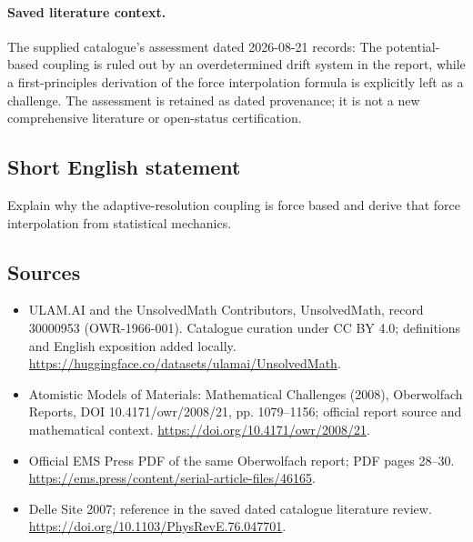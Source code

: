 \documentclass[11pt]{article}
\begin{document}
\paragraph{Saved literature context.} The supplied catalogue's assessment dated 2026-08-21 records: The potential-based coupling is ruled out by an overdetermined drift system in the report, while a first-principles derivation of the force interpolation formula is explicitly left as a challenge. The assessment is retained as dated provenance; it is not a new comprehensive literature or open-status certification.
\subsection{Short English statement}
Explain why the adaptive-resolution coupling is force based and derive that force interpolation from statistical mechanics.
\subsection{Sources}
\begin{itemize}
\item[\hypertarget{source:30000953:1}{S1}] ULAM.AI and the UnsolvedMath Contributors, UnsolvedMath, record 30000953 (OWR-1966-001). Catalogue curation under CC BY 4.0; definitions and English exposition added locally.
\url{https://huggingface.co/datasets/ulamai/UnsolvedMath}.
\item[\hypertarget{source:30000953:2}{S2}] Atomistic Models of Materials: Mathematical Challenges (2008), Oberwolfach Reports, DOI 10.4171/owr/2008/21, pp. 1079--1156; official report source and mathematical context.
\url{https://doi.org/10.4171/owr/2008/21}.
\item[\hypertarget{source:30000953:3}{S3}] Official EMS Press PDF of the same Oberwolfach report; PDF pages 28--30.
\url{https://ems.press/content/serial-article-files/46165}.
\item[\hypertarget{source:30000953:4}{S4}] Delle Site 2007; reference in the saved dated catalogue literature review.
\url{https://doi.org/10.1103/PhysRevE.76.047701}.
\end{itemize}
\label{end:30000953}
\end{document}
